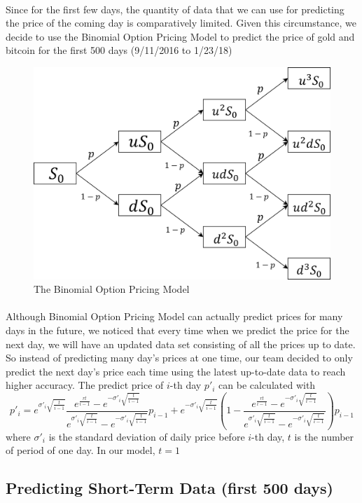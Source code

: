 \documentclass[12pt]{article}
\begin{document}
\paragraph{}
Since for the first few days, the quantity of data that we can use for predicting the price of the coming day is comparatively limited. Given this circumstance, we decide to use the Binomial Option Pricing Model to predict the price of gold and bitcoin for the first 500 days (9/11/2016 to 1/23/18)
\begin{figure}[htp]
    \centering
        \includegraphics[width=.4\linewidth]{figures/fig3.png}  
        \caption{The Binomial Option Pricing Model}
        \label{fig:fig3}
\end{figure}
\paragraph{}
Although Binomial Option Pricing Model can actually predict prices for many days in the future, we noticed that every time when we predict the price for the next day, we will have an updated data set consisting of all the prices up to date. So instead of predicting many day's prices at one time, our team decided to only predict the next day's price each time using the latest up-to-date data to reach higher accuracy.  The predict price of $i$-th day $p'_{i}$ can be calculated with
\begin{equation}
    p'_{i}=e^{\sigma'_i\sqrt{\frac{t}{i-1}}} \frac{e^{\frac{rt}{i-1}}-e^{-\sigma'_i\sqrt{\frac{t}{i-1}}}}{e^{\sigma'_i\sqrt{\frac{t}{i-1}}}-e^{-\sigma'_i\sqrt{\frac{t}{i-1}}}} p_{i-1}+e^{-\sigma'_i\sqrt{\frac{t}{i-1}}} (1-\frac{e^{\frac{rt}{i-1}}-e^{-\sigma'_i\sqrt{\frac{t}{i-1}}}}{e^{\sigma'_i\sqrt{\frac{t}{i-1}}}-e^{-\sigma'_i\sqrt{\frac{t}{i-1}}}})p_{i-1}
\end{equation}
where $\sigma'_i$ is the standard deviation of daily price before $i$-th day, $t$ is the number of period of one day. In our model, $t=1$
\subsection{Predicting Short-Term Data (first 500 days)}
\end{document}
